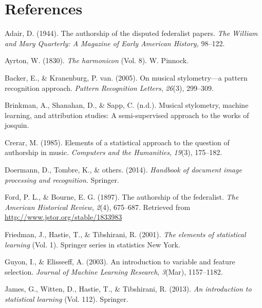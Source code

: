 \documentclass[12pt,twoside]{reedthesis}
\theoremstyle{definition}
\theoremstyle{definition}
\theoremstyle{definition}
\theoremstyle{remark}
\begin{document}
\chapter*{References}\label{references}


\noindent

\setlength{\parindent}{-0.20in} \setlength{\leftskip}{0.20in}
\setlength{\parskip}{8pt}

\hypertarget{refs}{}
\hypertarget{ref-adair1944}{}
Adair, D. (1944). The authorship of the disputed federalist papers.
\emph{The William and Mary Quarterly: A Magazine of Early American
History,} 98--122.

\hypertarget{ref-harmonicon}{}
Ayrton, W. (1830). \emph{The harmonicon} (Vol. 8). W. Pinnock.

\hypertarget{ref-backer2005}{}
Backer, E., \& Kranenburg, P. van. (2005). On musical stylometry---a
pattern recognition approach. \emph{Pattern Recognition Letters},
\emph{26}(3), 299--309.

\hypertarget{ref-brinkman2016}{}
Brinkman, A., Shanahan, D., \& Sapp, C. (n.d.). Musical stylometry,
machine learning, and attribution studies: A semi-supervised approach to
the works of josquin.

\hypertarget{ref-crerar}{}
Crerar, M. (1985). Elements of a statistical approach to the question of
authorship in music. \emph{Computers and the Humanities}, \emph{19}(3),
175--182.

\hypertarget{ref-OMR}{}
Doermann, D., Tombre, K., \& others. (2014). \emph{Handbook of document
image processing and recognition}. Springer.

\hypertarget{ref-authorshipfed}{}
Ford, P. L., \& Bourne, E. G. (1897). The authorship of the federalist.
\emph{The American Historical Review}, \emph{2}(4), 675--687. Retrieved
from \url{http://www.jstor.org/stable/1833983}

\hypertarget{ref-esl}{}
Friedman, J., Hastie, T., \& Tibshirani, R. (2001). \emph{The elements
of statistical learning} (Vol. 1). Springer series in statistics New
York.

\hypertarget{ref-guyon2003}{}
Guyon, I., \& Elisseeff, A. (2003). An introduction to variable and
feature selection. \emph{Journal of Machine Learning Research},
\emph{3}(Mar), 1157--1182.

\hypertarget{ref-isl}{}
James, G., Witten, D., Hastie, T., \& Tibshirani, R. (2013). \emph{An
introduction to statistical learning} (Vol. 112). Springer.
\end{document}
